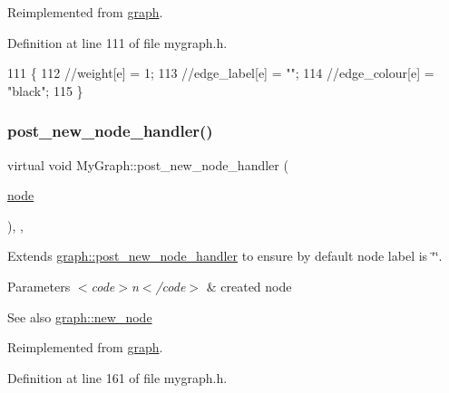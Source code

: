 Reimplemented from \mbox{\hyperlink{classgraph_a443182426b461aa9f4b1c9f5ac535179}{graph}}.



Definition at line 111 of file mygraph.\+h.


\begin{DoxyCode}
111                                                \{
112         \textcolor{comment}{//weight[e] = 1;}
113         \textcolor{comment}{//edge\_label[e] = "";}
114         \textcolor{comment}{//edge\_colour[e] = "black";}
115     \}
\end{DoxyCode}
\mbox{\label{class_my_graph_a21153d685303a6d2cfeee913aeb81223}} 
\subsubsection{\texorpdfstring{post\+\_\+new\+\_\+node\+\_\+handler()}{post\_new\_node\_handler()}}
{\footnotesize\ttfamily virtual void My\+Graph\+::post\+\_\+new\+\_\+node\+\_\+handler (\begin{DoxyParamCaption}\item[{\mbox{\hyperlink{classnode}{node}}}]{ }\end{DoxyParamCaption})\hspace{0.3cm}{\ttfamily [inline]}, {\ttfamily [virtual]}, {\ttfamily [inherited]}}

Extends \mbox{\hyperlink{classgraph_acfe5bc8bdad9fa426750901144319e5f}{graph\+::post\+\_\+new\+\_\+node\+\_\+handler}} to ensure by default node label is \char`\"{}\char`\"{}.


\begin{DoxyParams}{Parameters}
{\em $<$code$>$n$<$/code$>$} & created node \\
\hline
\end{DoxyParams}
\begin{DoxySeeAlso}{See also}
\mbox{\hyperlink{classgraph_ab9505335c20558319b6cce25aed23524}{graph\+::new\+\_\+node}} 
\end{DoxySeeAlso}


Reimplemented from \mbox{\hyperlink{classgraph_acfe5bc8bdad9fa426750901144319e5f}{graph}}.



Definition at line 161 of file mygraph.\+h.


